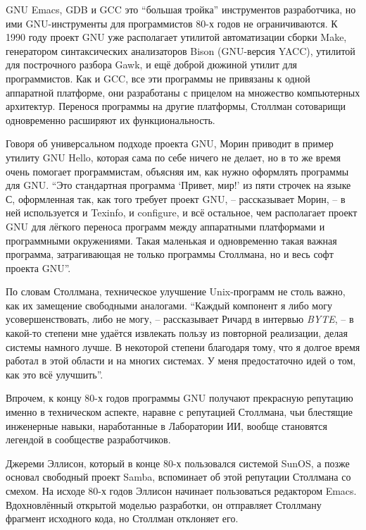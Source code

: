 GNU Emacs, GDB и GCC это \enquote{большая тройка} инструментов разработчика, но ими GNU-инструменты для программистов 80-х годов не ограничиваются. К 1990 году проект GNU уже располагает утилитой автоматизации сборки Make, генератором синтаксических анализаторов Bison (GNU-версия YACC), утилитой для построчного разбора Gawk, и ещё доброй дюжиной утилит для программистов. Как и GCC, все эти программы не привязаны к одной аппаратной платформе, они разработаны с прицелом на множество компьютерных архитектур. Перенося программы на другие платформы, Столлман сотоварищи одновременно расширяют их функциональность.

Говоря об универсальном подходе проекта GNU, Морин приводит в пример утилиту GNU Hello, которая сама по себе ничего не делает, но в то же время очень помогает программистам, объясняя им, как нужно оформлять программы для GNU. \enquote{Это стандартная программа \enquote{Привет, мир!} из пяти строчек на языке С, оформленная так, как того требует проект GNU, -- рассказывает Морин, -- в ней используется и Texinfo, и configure, и всё остальное, чем располагает проект GNU для лёгкого переноса программ между аппаратными платформами и программными окружениями. Такая маленькая и одновременно такая важная программа, затрагивающая не только программы Столлмана, но и весь софт проекта GNU}.

По словам Столлмана, техническое улучшение Unix-программ не столь важно, как их замещение свободными аналогами. \enquote{Каждый компонент я либо могу усовершенствовать, либо не могу, -- рассказывает Ричард в интервью \textit{BYTE}, -- в какой-то степени мне удаётся извлекать пользу из повторной реализации, делая системы намного лучше. В некоторой степени благодаря тому, что я долгое время работал в этой области и на многих системах. У меня предостаточно идей о том, как это всё улучшить}.

Впрочем, к концу 80-х годов программы GNU получают прекрасную репутацию именно в техническом аспекте, наравне с репутацией Столлмана, чьи блестящие инженерные навыки, наработанные в Лаборатории ИИ, вообще становятся легендой в сообществе разработчиков.

Джереми Эллисон, который в конце 80-х пользовался системой SunOS, а позже основал свободный проект Samba, вспоминает об этой репутации Столлмана со смехом. На исходе 80-х годов Эллисон начинает пользоваться редактором Emacs. Вдохновлённый открытой моделью разработки, он отправляет Столлману фрагмент исходного кода, но Столлман отклоняет его.

